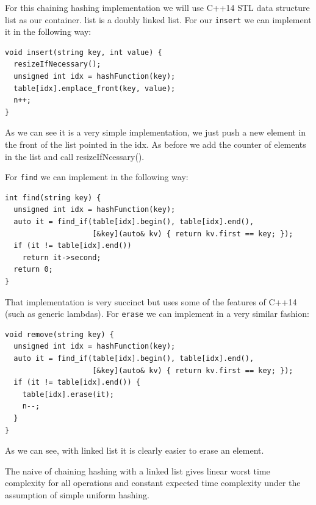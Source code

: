 For this chaining hashing implementation we will use C++14 STL data structure list as our container. list is a doubly linked list. For our \texttt{insert} we can implement it in the following way:

\begin{lstlisting}
void insert(string key, int value) {
  resizeIfNecessary();
  unsigned int idx = hashFunction(key);      
  table[idx].emplace_front(key, value);
  n++;
}
\end{lstlisting}

As we can see it is a very simple implementation, we just push a new element in the front of the list pointed in the idx. As before we add the counter of elements in the list and call resizeIfNcessary().

For \texttt{find} we can implement in the following way:

\begin{lstlisting}
int find(string key) {
  unsigned int idx = hashFunction(key);
  auto it = find_if(table[idx].begin(), table[idx].end(),
                    [&key](auto& kv) { return kv.first == key; });
  if (it != table[idx].end())
    return it->second;
  return 0;
}
\end{lstlisting}

That implementation is very succinct but uses some of the features of C++14 (such as generic lambdas). For \texttt{erase} we can implement in a very similar fashion:

\begin{lstlisting}
void remove(string key) {
  unsigned int idx = hashFunction(key);
  auto it = find_if(table[idx].begin(), table[idx].end(),
                    [&key](auto& kv) { return kv.first == key; });
  if (it != table[idx].end()) {
    table[idx].erase(it);
    n--;
  }
}
\end{lstlisting}

As we can see, with linked list it is clearly easier to erase an element. 

The naive of chaining hashing with a linked list gives linear worst time complexity for all operations and constant expected time complexity under the assumption of simple uniform hashing. 



